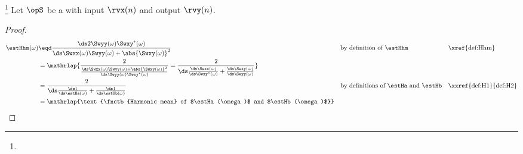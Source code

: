 \begin{proposition}                                       %
\footnote{                                                %
  }                                                       %
\label{prop:Hhm}                                          %
Let $\opS$ be a  with input $\rvx(n)$ and output $\rvy(n)$.
\end{proposition}
\begin{proof}
\begin{align*}
  \estHhm(\omega)
    &\eqd \frac{\ds2\Swyy(\omega)\Swxy^\ast(\omega)}
               {\ds\Swxx(\omega)\Swyy(\omega) + \abs{\Swxy(\omega)}^2}
    && \text{by definition of $\estHhm$}
    && \text{\xref{def:Hhm}}
  \\&= \mathrlap{
       \frac{2}{\frac{\ds\Swxx(\omega)\Swyy(\omega) + \abs{\Swxy(\omega)}^2}
                     {\ds\Swyy(\omega)\Swxy^\ast(\omega)}}
     = \frac{2}{\ds                                  %
         \frac{\ds\Swxx(\omega)}                     %
              {\ds\Swxy^\ast(\omega)}                %
         +                                           %
         \frac{\ds\Swxy(\omega)}                     %
              {\ds\Swyy(\omega)}                     %
               }}                                    %
  \\&= \frac{2}{\ds                                  %
         \frac{\ds1}{\ds\estHa(\omega)}              %
        +\frac{\ds1}{\ds\estHb(\omega)}}             %
    && \text{by definitions of $\estHa$ and $\estHb$}%
    && \text{\xxref{def:H1}{def:H2}}                 %
  \\&= \mathrlap{\text{\fnctb{Harmonic mean} of $\estHa(\omega)$ and $\estHb(\omega)$}}
\end{align*}
\end{proof}

